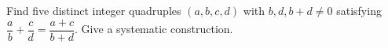 Find five distinct integer quadruples $(a,b,c,d)$ with $ b,d,b+d\ne0 $ satisfying $\dfrac{a}{b}+\dfrac{c}{d}=\dfrac{a+c}{b+d}$. Give a systematic construction.
